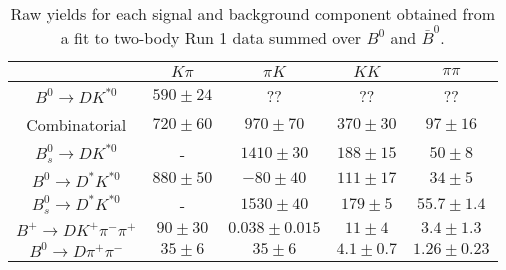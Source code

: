 \begin{table}
  \centering
  \begin{tabular}{ccccc}
      \toprule
       & $K\pi$ & $\pi K$ & $KK$ & $\pi\pi$ \\
      \midrule
      $B^0 \to DK^{*0}$ & $590 \pm 24$ & ?? & ?? & ?? \\
      Combinatorial & $720 \pm 60$ & $970 \pm 70$ & $370 \pm 30$ & $97 \pm 16$ \\
      $B^0_s \to DK^{*0}$ & \-- & $1410 \pm 30$ & $188 \pm 15$ & $50 \pm 8$ \\
      $B^0 \to D^*K^{*0}$ & $880 \pm 50$ & $-80 \pm 40$ & $111 \pm 17$ & $34 \pm 5$ \\
      $B^0_s \to D^*K^{*0}$ & \-- & $1530 \pm 40$ & $179 \pm 5$ & $55.7 \pm 1.4$ \\
      $B^+ \to DK^+\pi^-\pi^+$ & $90 \pm 30$ & $0.038 \pm 0.015$ & $11 \pm 4$ & $3.4 \pm 1.3$ \\
      $B^0 \to D\pi^+\pi^-$ & $35 \pm 6$ & $35 \pm 6$ & $4.1 \pm 0.7$ & $1.26 \pm 0.23$ \\
      \bottomrule
      \end{tabular}
  \caption{Raw yields for each signal and background component obtained from a fit to two-body Run 1 data summed over $B^0$ and $\bar{B}^0$.}
\label{tab:yields_combined_2body_run1}
\end{table}
